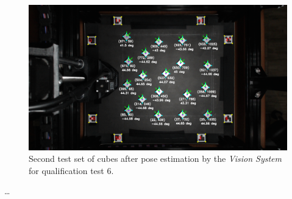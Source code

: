 \begin{figure}[!ht]
	\centering
	\includegraphics[width=1\linewidth]{figures/qtp6-set2-annotated.png}
	\caption{Second test set of cubes after pose estimation by the \textit{Vision System} for qualification test 6.}
	\label{fig:qtp6-set2-annotated}
\end{figure}



\dots





